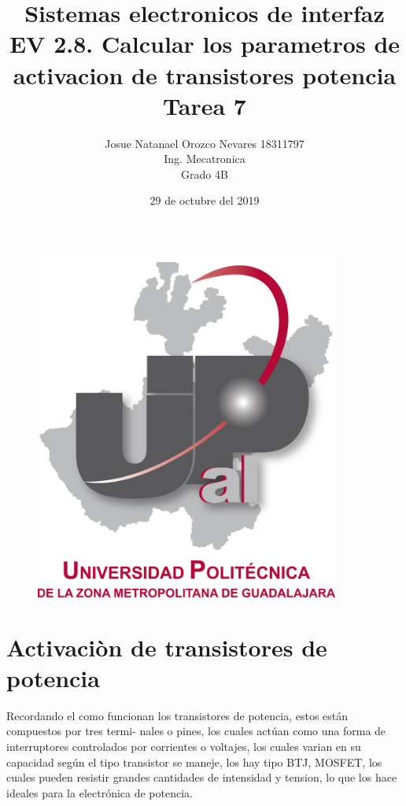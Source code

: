 \documentclass[12pt,a4paper]{article}
\begin{document}
\title{\textbf{Sistemas electronicos de interfaz\\EV 2.8. Calcular los parametros de activacion de transistores  potencia\\Tarea 7}}
\author{Josue Natanael Orozco Nevares 18311797\\Ing. Mecatronica\\Grado 4B}
\date{29 de octubre del 2019}
\maketitle

\begin{figure}[h!]
\centering
\includegraphics[width=10cm]{UPCDLZMDG5783-logo.png} 
\end{figure}
\newpage

\section{Activaciòn de transistores de potencia}
Recordando el como funcionan los transistores de potencia, estos están compuestos por tres termi-
nales o pines, los cuales actúan como una forma de interruptores controlados por corrientes o voltajes,
los cuales varian en su capacidad según el tipo transistor se maneje, los hay tipo BTJ, MOSFET,
los cuales pueden resistir grandes cantidades de intensidad y tension, lo que los hace ideales para la
electrónica de potencia.
\end{document}
